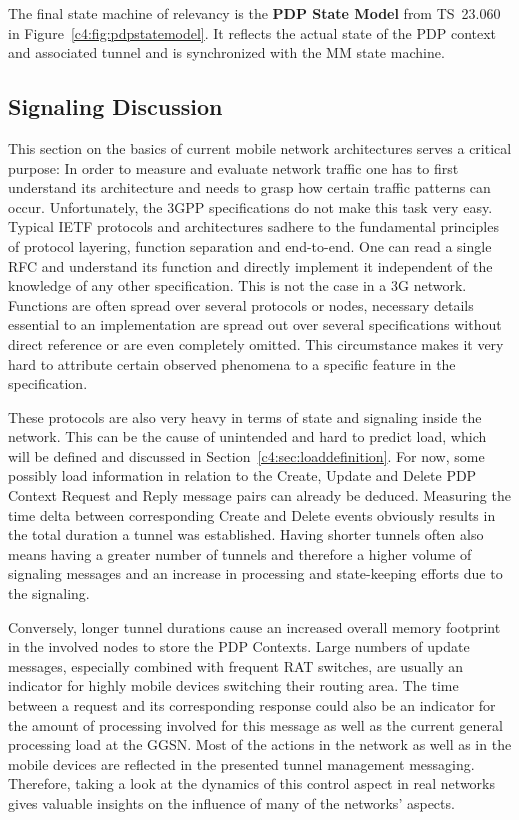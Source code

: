 The final state machine of relevancy is the \textbf{\gls{PDP} State Model} from \gls{TS}~23.060~\cite[Section~9]{3gpp.23.060} in Figure~\ref{c4:fig:pdpstatemodel}. It reflects the actual state of the \gls{PDP} context and associated tunnel and is synchronized with the \gls{MM} state machine.


\subsection{Signaling Discussion}

This section on the basics of current mobile network architectures serves a critical purpose: In order to measure and evaluate network traffic one has to first understand its architecture and needs to grasp how certain traffic patterns can occur. Unfortunately, the \gls{3GPP} specifications do not make this task very easy. Typical \gls{IETF} protocols and architectures sadhere to the fundamental principles of protocol layering, function separation and end-to-end. One can read a single \gls{RFC} and understand its function and directly implement it independent of the knowledge of any other specification. This is not the case in a \gls{3G} network. Functions are often spread over several protocols or nodes, necessary details essential to an implementation are spread out over several specifications without direct reference or are even completely omitted. This circumstance makes it very hard to attribute certain observed phenomena to a specific feature in the specification.

These protocols are also very heavy in terms of state and signaling inside the network. This can be the cause of unintended and hard to predict load, which will be defined and discussed in Section~\ref{c4:sec:loaddefinition}. For now, some possibly load information in relation to the Create, Update and Delete \gls{PDP} Context Request and Reply message pairs can already be deduced. Measuring the time delta between corresponding Create and Delete events obviously results in the total duration a tunnel was established. Having shorter tunnels often also means having a greater number of tunnels and therefore a higher volume of signaling messages and an increase in processing and state-keeping efforts due to the signaling. 

Conversely, longer tunnel durations cause an increased overall memory footprint in the involved nodes to store the \gls{PDP} Contexts. Large numbers of update messages, especially combined with frequent \gls{RAT} switches, are usually an indicator for highly mobile devices switching their routing area. The time between a request and its corresponding response could also be an indicator for the amount of processing involved for this message as well as the current general processing load at the \gls{GGSN}. Most of the actions in the network as well as in the mobile devices are reflected in the presented tunnel management messaging. Therefore, taking a look at the dynamics of this control aspect in real networks gives valuable insights on the influence of many of the networks' aspects.





